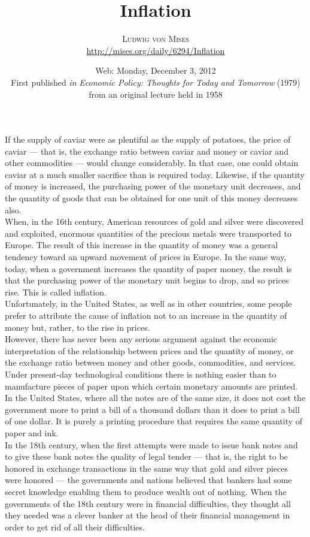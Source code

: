 \documentclass[a4paper]{article}
\title{Inflation}
\author{\textsc{Ludwig von Mises}\\ \url{http://mises.org/daily/6294/Inflation}}
\date{Web: Monday, December 3, 2012\\
First published \emph{in} \emph{Economic Policy: Thoughts for Today and Tomorrow} (1979) from an original lecture held in 1958}
\begin{document}
\maketitle

If the supply of caviar were as plentiful as the supply of potatoes, the price 
of caviar — that is, the exchange ratio between caviar and money or caviar and 
other commodities — would change considerably. In that case, one could obtain 
caviar at a much smaller sacrifice than is required today. Likewise, if the 
quantity of money is increased, the purchasing power of the monetary unit 
decreases, and the quantity of goods that can be obtained for one unit of this 
money decreases also.\\

When, in the 16th century, American resources of gold and silver were 
discovered and exploited, enormous quantities of the precious metals were 
transported to Europe. The result of this increase in the quantity of money was
a general tendency toward an upward movement of prices in Europe. In the same 
way, today, when a government increases the quantity of paper money, the result
is that the purchasing power of the monetary unit begins to drop, and so prices
rise. This is called inflation.\\

Unfortunately, in the United States, as well as in other countries, some people
prefer to attribute the cause of inflation not to an increase in the quantity 
of money but, rather, to the rise in prices.\\

However, there has never been any serious argument against the economic 
interpretation of the relationship between prices and the quantity of money, or
the exchange ratio between money and other goods, commodities, and services. 
Under present-day technological conditions there is nothing easier than to 
manufacture pieces of paper upon which certain monetary amounts are printed. In
the United States, where all the notes are of the same size, it does not cost 
the government more to print a bill of a thousand dollars than it does to print
a bill of one dollar. It is purely a printing procedure that requires the same 
quantity of paper and ink.\\

In the 18th century, when the first attempts were made to issue bank notes and 
to give these bank notes the quality of legal tender — that is, the right to be
honored in exchange transactions in the same way that gold and silver pieces 
were honored — the governments and nations believed that bankers had some 
secret knowledge enabling them to produce wealth out of nothing. When the 
governments of the 18th century were in financial difficulties, they thought 
all they needed was a clever banker at the head of their financial management 
in order to get rid of all their difficulties.\\
\end{document}
